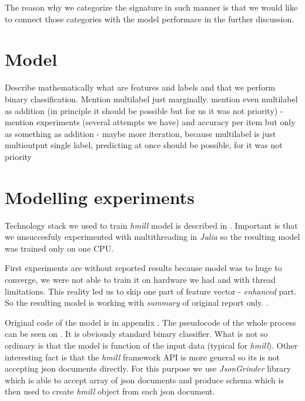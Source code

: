 The reason why we categorize the signature in such manner is that we would like to connect those categories with the model performace in the further discussion.

\section{Model}
Describe mathematically what are features and labels and that we perform binary classification. Mention multilabel just marginally.
mention even multilabel as addition (in principle it should be possible but for us it was not priority)
- mention experiments (several attempts we have) and accuracy per item but only as something as addition - maybe more iteration, because multilabel is just multioutput single label, predicting at once should be possible, for it was not priority

\section{Modelling experiments}
Technology stack we used to train \emph{hmill} model is described in . Important is that we unsuccesfuly experimented with multithreading in \emph{Julia} so the resulting model was trained only on one CPU.

First experiments are without reported results because model was to huge to converge, we were not able to train it on hardware we had and with thread limitations. This reality led us to skip one part of feature vector - \emph{enhanced} part. So the resulting model is working with \emph{summary} of original report only. .

Original code of the model is in appendix . The pseudocode of the whole process can be seen on . It is obviously standard binary classifier. What is not so ordinary is that the model is function of the input data (typical for \emph{hmill}). Other interesting fact is that the \emph{hmill} framework API is more general so its is not accepting json documents directly. For this purpose we use \emph{JsonGrinder} library  which is able to accept array of json documents and produce schema  which is then used to create \emph{hmill} object from each json document.

